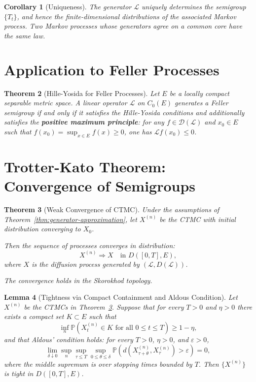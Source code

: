 \documentclass[11pt,a4paper,openany]{book}
\theoremstyle{definition}
\theoremstyle{plain}
\newtheorem{theorem}{Theorem}[chapter]
\newtheorem{lemma}[theorem]{Lemma}
\newtheorem{corollary}[theorem]{Corollary}
\theoremstyle{remark}
\newcommand{\1}{\mathbbm{1}}
\newcommand{\calL}{\mathcal{L}}
\newcommand{\calD}{\mathcal{D}}
\begin{document}
\begin{corollary}[Uniqueness]
The generator $\calL$ uniquely determines the semigroup $\{T_{t}\}$, and hence the finite-dimensional distributions of the associated Markov process. Two Markov processes whose generators agree on a common core have the same law.
\end{corollary}

\section{Application to Feller Processes}

\begin{theorem}[Hille-Yosida for Feller Processes]
Let $E$ be a locally compact separable metric space. A linear operator $\calL$ on $C_{0}(E)$ generates a Feller semigroup if and only if it satisfies the Hille-Yosida conditions and additionally satisfies the \textbf{positive maximum principle}: for any $f \in \calD(\calL)$ and $x_{0} \in E$ such that $f(x_{0}) = \sup_{x \in E} f(x) \geq 0$, one has $\calL f(x_{0}) \leq 0$.
\end{theorem}

\section{Trotter-Kato Theorem: Convergence of Semigroups}

\begin{theorem}[Weak Convergence of CTMC]
\label{thm:weak-convergence-ctmc}
Under the assumptions of Theorem~\ref{thm:generator-approximation}, let $X^{(n)}$ be the CTMC with initial distribution converging to $X_{0}$.

Then the sequence of processes converges in distribution:
\[
X^{(n)} \Rightarrow X \quad \text{in } D([0,T],E),
\]
where $X$ is the diffusion process generated by $(\mathcal{L}, D(\mathcal{L}))$.

The convergence holds in the Skorokhod topology.
\end{theorem}

\begin{lemma}[Tightness via Compact Containment and Aldous Condition]
\label{lem:tightness-ctmc}
Let $X^{(n)}$ be the CTMCs in Theorem~\ref{thm:weak-convergence-ctmc}. Suppose that for every $T>0$ and $\eta>0$ there exists a compact set $K\subset E$ such that
\[
\inf_n \mathbb{P}\left(X_t^{(n)}\in K \text{ for all } 0\le t\le T\right) \ge 1-\eta,
\]
and that Aldous' condition holds: for every $T>0$, $\eta>0$, and $\varepsilon>0$,
\[
\lim_{\delta\downarrow0}\sup_n\sup_{\tau\le T}\sup_{0\le\theta\le\delta}
\mathbb{P}\left(d(X_{\tau+\theta}^{(n)},X_{\tau}^{(n)})>\varepsilon\right)=0,
\]
where the middle supremum is over stopping times bounded by $T$. Then $\{X^{(n)}\}$ is tight in $D([0,T],E)$.
\end{lemma}
\end{document}
